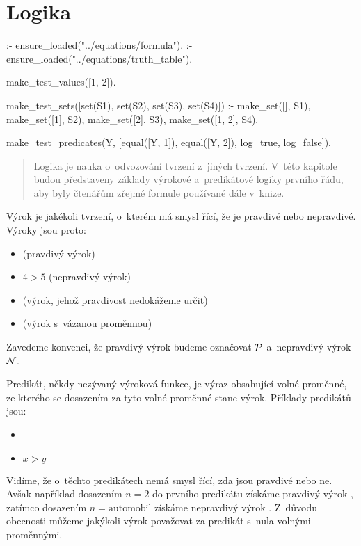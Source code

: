 \chapter{Logika}

\begin{prolog}
:- ensure_loaded("../equations/formula").
:- ensure_loaded("../equations/truth_table").

make_test_values([1, 2]).

make_test_sets([set(S1), set(S2), set(S3), set(S4)]) :-
	make_set([], S1),
	make_set([1], S2),
	make_set([2], S3),
	make_set([1, 2], S4).

make_test_predicates(Y, [equal([Y, 1]), equal([Y, 2]), log_true, log_false]).
\end{prolog}


\begin{abstract}
Logika je nauka o~odvozování tvrzení z~jiných tvrzení. V~této kapitole budou představeny základy výrokové a~predikátové logiky prvního řádu, aby byly čtenářům zřejmé formule používané dále v~knize.
\end{abstract}

Výrok je jakékoli tvrzení, o~kterém má smysl řící, že je pravdivé nebo nepravdivé. Výroky jsou proto:

\begin{itemize}
	\item {} (pravdivý výrok)
	\item \(4 > 5\) (nepravdivý výrok)
	\item {} (výrok, jehož pravdivost nedokážeme určit)
	\item {} (výrok s~vázanou proměnnou)
\end{itemize}

Zavedeme konvenci, že pravdivý výrok budeme označovat \(\mathcal{P}\) a~nepravdivý výrok \(\mathcal{N}\).

Predikát, někdy nezývaný výroková funkce, je výraz obsahující volné proměnné, ze kterého se dosazením za tyto volné proměnné stane výrok. Příklady predikátů jsou:

\begin{itemize}
	\item {}
	\item \(x > y\)
\end{itemize}

Vidíme, že o~těchto predikátech nemá smysl řící, zda jsou pravdivé nebo ne. Avšak například dosazením \(n = 2\) do prvního predikátu získáme pravdivý výrok , zatímco dosazením \(n = \mathrm{automobil}\) získáme nepravdivý výrok . Z~důvodu obecnosti můžeme jakýkoli výrok považovat za predikát s~nula volnými proměnnými.

